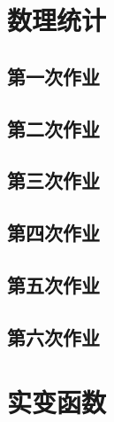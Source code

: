 \documentclass[
	leqno, %
	a4paper, %
	fontsize=12pt, %
	twoside=false, %
	open=any, %
	chapterentrydots=true, %
	numbers=noenddot, %
    UTF-8, %
	toc=nottotoc,
	BCOR=12mm,
	DIV=calc,
]{styles/kaobook}
\begin{document}

\setchapterpreamble[u]{\margintoc}
\chapter{数理统计}





% 






\section{第一次作业}

\section{第二次作业}

\section{第三次作业}

\section{第四次作业}

\section{第五次作业}

\section{第六次作业}



\setchapterpreamble[u]{\margintoc}
\chapter{实变函数}







\end{document}
